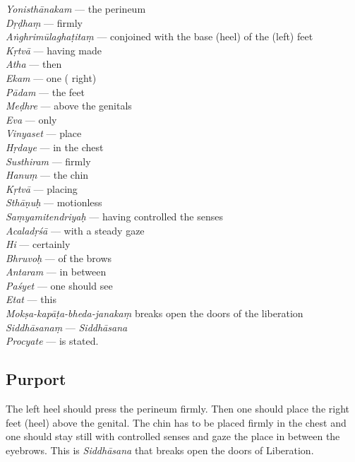 \begin{multicols}{2}
\textit{Yonisthānakam} --- the perineum \\
\textit{Dṛḍhaṃ} --- firmly  \\
\textit{Aṅghrimūlaghaṭitaṃ} --- conjoined with the base (heel) of the (left) feet  \\
\textit{Kṛtvā} --- having made \\
\textit{Atha} --- then\\
\textit{Ekam} --- one ( right)  \\
\textit{Pādam} --- the feet \\
\textit{Meḍhre} --- above the genitals \\
\textit{Eva} --- only \\
\textit{Vinyaset} --- place \\
\textit{Hṛdaye} --- in the chest \\
\textit{Susthiram} --- firmly \\
\textit{Hanuṃ} --- the chin \\
\textit{Kṛtvā} --- placing \\
\textit{Sthāṇuḥ} --- motionless\\
\textit{Saṃyamitendriyaḥ} --- having controlled the senses  \\
\textit{Acaladṛśā}  --- with a  steady gaze  \\
\textit{Hi} --- certainly \\
\textit{Bhruvoḥ} --- of the brows  \\
\textit{Antaram}  --- in between \\
\textit{Paśyet} --- one should see \\
\textit{Etat} --- this  \\
\textit{Mokṣa-kapāṭa-bheda-janakaṃ} breaks open the doors of the liberation \\
\textit{Siddhāsanaṃ} --- \textit{Siddhāsana} \\
\textit{Procyate} --- is stated. 
\end{multicols}

\subsection*{Purport}

The left heel should press the perineum firmly. Then one should place the right feet (heel) above the genital.  The chin has to be placed firmly in the chest and one should stay still with controlled senses and gaze the place in between the eyebrows. This is \textit{Siddhāsana} that breaks open the doors of Liberation.


